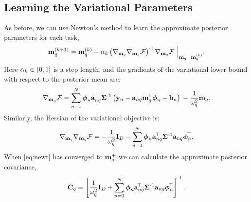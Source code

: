 \subsection{Learning the Variational Parameters}

As before, we can use Newton's method to learn the approximate posterior
parameters for each task,
\begin{equation}
    \mathbf{m}_{q}^{(k+1)} = \mathbf{m}_{q}^{(k)} - \alpha_k
        \left({\nabla_{\mathbf{m}_q} \nabla_{\mathbf{m}_q} \mathcal{F}}\right)^{\text{-}1}
        \nabla_{\mathbf{m}_q} \mathcal{F} ~ \Big|_{\mathbf{m}_q = \mathbf{m}_{q}^{(k)}}.
        \label{eq:newt}
\end{equation}
Here $\alpha_k \in (0, 1]$ is a step length, and the gradients of the 
variational lower bound with respect to the posterior mean are:
\begin{equation}
    \nabla_{\mathbf{m}_q} \mathcal{F} = \sum^N_{n=1} \boldsymbol\phi_n \mathbf{a}_{nq}^{\!\top}
        \mathbf{\Sigma}^{\text{-}1}
        \left({\mathbf{y}_n - \mathbf{a}_{nq}\mathbf{m}_q^{\!\top}\boldsymbol\phi_n - \mathbf{b}_n}\right)  \\
        - \frac{1}{\omega^2_q} \mathbf{m}_q \text{.}
 \end{equation}     
%
Similarly, the Hessian of the variational objective is: 
\begin{equation}     
    \nabla_{\mathbf{m}_q} \nabla_{\mathbf{m}_q} \mathcal{F} =
       - \frac{1}{\omega^2_q}  \mathbf{I}_{D}
        - \sum^N_{n=1} \boldsymbol\phi_n\mathbf{a}_{nq}^{\!\top}\mathbf{\Sigma}^{\text{-}1}
        \mathbf{a}_{nq}\boldsymbol\phi_n^{\!\top}.
\end{equation}
When \eqref{eq:newt} has converged to $\mathbf{m}_q^{+}$ we can calculate the
approximate posterior covariance,
\begin{equation}
    \mathbf{C}_q 
    = \left[{ \frac{1}{\omega^2_q} \mathbf{I}_{D}
        + \sum^N_{n=1} \boldsymbol\phi_n\mathbf{a}_{nq}^{\!\top}\mathbf{\Sigma}^{\text{-}1}
        \mathbf{a}_{nq}\boldsymbol\phi_n^{\!\top}}\right]^{\text{-}1}.
\end{equation}
 
